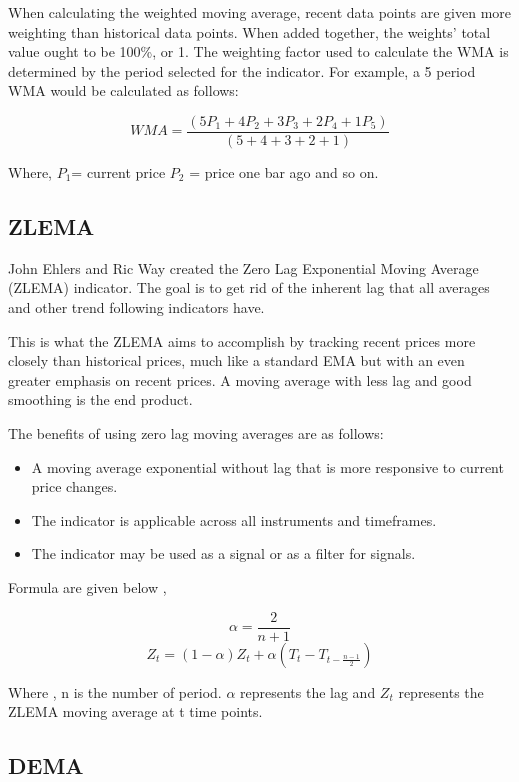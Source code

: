 \documentclass{article}
\providecommand{\tightlist}{%
  \setlength{\itemsep}{0pt}\setlength{\parskip}{0pt}}
\begin{document}
When calculating the weighted moving average, recent data points are
given more weighting than historical data points. When added together,
the weights' total value ought to be 100\%, or 1. The weighting factor
used to calculate the WMA is determined by the period selected for the
indicator. For example, a 5 period WMA would be calculated as follows:

\[
WMA = \frac{(5P_{1}  + 4P_2  + 3P_3  + 2P_4  + 1P_5 )} {(5 + 4+ 3 + 2 + 1)}
\]

Where, \(P_1\)= current price \(P_2\) = price one bar ago and so on.

\hypertarget{zlema}{%
\subsection{ZLEMA}\label{zlema}}

John Ehlers and Ric Way created the Zero Lag Exponential Moving Average
(ZLEMA) indicator. The goal is to get rid of the inherent lag that all
averages and other trend following indicators have.

This is what the ZLEMA aims to accomplish by tracking recent prices more
closely than historical prices, much like a standard EMA but with an
even greater emphasis on recent prices. A moving average with less lag
and good smoothing is the end product.

The benefits of using zero lag moving averages are as follows:

\begin{itemize}
\tightlist
\item
  A moving average exponential without lag that is more responsive to
  current price changes.
\item
  The indicator is applicable across all instruments and timeframes.
\item
  The indicator may be used as a signal or as a filter for signals.
\end{itemize}

Formula are given below ,

\[
\alpha = \frac{2}{n+1}  
\] \[
Z_{t} = (1-\alpha)Z_t + \alpha (T_t - T_{t-\frac{n-1}{2}})
\]

Where , n is the number of period. \(\alpha\) represents the lag and
\(Z_t\) represents the ZLEMA moving average at t time points.

\hypertarget{dema}{%
\subsection{DEMA}\label{dema}}
\end{document}
